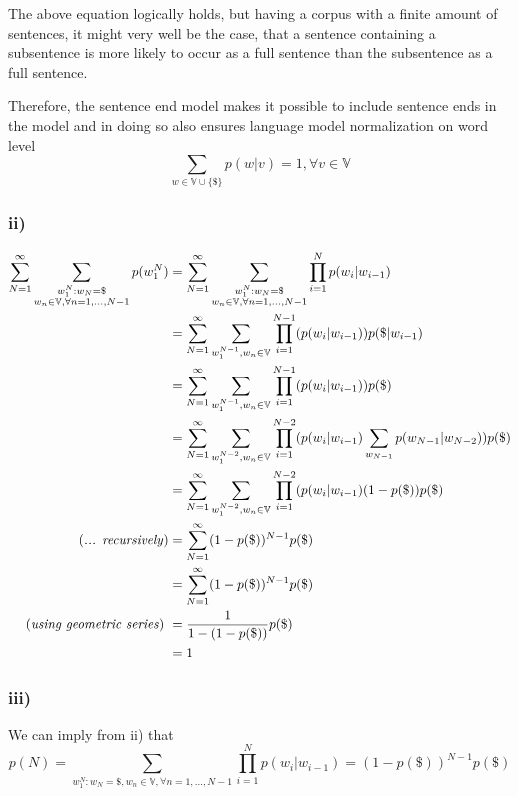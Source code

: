 The above equation logically holds, but having a corpus with a finite 
amount of sentences, it might very well be the case, that a sentence containing 
a subsentence is more likely to occur as a full sentence than the subsentence 
as a full sentence. 

Therefore, the sentence end model makes it possible to include sentence ends 
in the model and in doing so also ensures language model normalization on word 
level 
\[
	\sum_{w \in \mathbb{V} \cup \{\$\}} p(w|v) = 1, \forall v \in \mathbb{V}
\]

\subsubsection*{ii)}%
\label{ssub:ii_}


\begin{align*}
	\sum_{N=1}^{\infty}  \sum_{\substack{w_{1}^{N}: w_N = \$ \\ w_n \in \mathbb{V}, \forall n = 1,...,N-1}} p(w_1^{N}) &= \sum_{N=1}^{\infty}  \sum_{\substack{w_{1}^{N}: w_N = \$ \\ w_n \in \mathbb{V}, \forall n = 1,...,N-1}} \prod_{i = 1}^{N} p(w_i|w_{i-1})  \\
	&= \sum_{N=1}^{\infty} \sum_{w_{1}^{N-1},w_n \in \mathbb{V}} \prod_{i = 1}^{N-1} (p(w_i|w_{i-1})) p(\$|w_{i-1})  \\
	&= \sum_{N=1}^{\infty} \sum_{w_{1}^{N-1},w_n \in \mathbb{V}} \prod_{i = 1}^{N-1} (p(w_i|w_{i-1})) p(\$)  \\
	&= \sum_{N=1}^{\infty} \sum_{w_{1}^{N-2},w_n \in \mathbb{V}} \prod_{i = 1}^{N-2} (p(w_i|w_{i-1})\sum_{w_{N-1}} p(w_{N-1}|w_{N-2})) p(\$)  \\
	&= \sum_{N=1}^{\infty} \sum_{w_{1}^{N-2},w_n \in \mathbb{V}} \prod_{i = 1}^{N-2} (p(w_i|w_{i-1})(1-p(\$)) p(\$)  \\
\text{(\textit{... recursively})} 
	&= \sum_{N=1}^{\infty} (1-p(\$))^{N-1} p(\$)  \\
	&= \sum_{N=1}^{\infty}  (1-p(\$))^{N-1} p(\$)  \\
\text{(\textit{using geometric series}) }
	&= \frac{1}{1 - (1 -p(\$))} p(\$)  \\
  	&= 1
\end{align*}

\subsubsection*{iii)}%
\label{ssub:iii_}

We can imply from ii) that 
\[
	p(N) = \sum_{w_{1}^{N}: w_N = \$, w_n \in \mathbb{V}, \forall n = 1,...,N-1} \prod_{i = 1}^{N} p(w_i|w_{i-1}) = (1-p(\$))^{N-1} p(\$) 
\]

